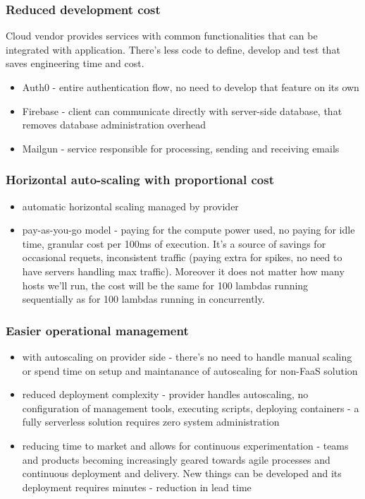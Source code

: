 \subsubsection*{Reduced development cost}

Cloud vendor provides services with common functionalities that can be integrated with application. There's less code to define, develop and test that saves engineering time and cost.
\begin{itemize}
    \item Auth0 - entire authentication flow, no need to develop that feature on its own
    \item Firebase - client can communicate directly with server-side database, that removes database administration overhead
    \item Mailgun - service responsible for processing, sending and receiving emails
\end{itemize}

\subsubsection*{Horizontal auto-scaling with proportional cost}

\begin{itemize}
    \item automatic horizontal scaling managed by provider 
    \item pay-as-you-go model - paying for the compute power used, no paying for idle time, granular cost per 100ms of execution. It's a source of savings for occasional requets, inconsistent traffic (paying extra for spikes, no need to have servers handling max traffic). Moreover it does not matter how many hosts we'll run, the cost will be the same for 100 lambdas running sequentially as for 100 lambdas running in concurrently.
\end{itemize}

\subsubsection*{Easier operational management}

\begin{itemize}
    \item with autoscaling on provider side - there's no need to handle manual scaling or spend time on setup and maintanance of autoscaling for non-FaaS solution
    \item reduced deployment complexity - provider handles autoscaling, no configuration of management tools, executing scripts, deploying containers - a fully serverless solution requires zero system administration
    \item reducing time to market and allows for continuous experimentation - teams and products becoming increasingly geared towards agile processes and continuous deployment and delivery. New things can be developed and its deployment requires minutes - reduction in lead time
\end{itemize}


